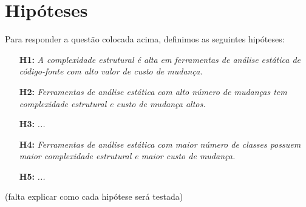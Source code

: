 \section{Hipóteses} \label{hipoteses}

Para responder a questão colocada acima, definimos as seguintes hipóteses:

\begin{enumerate}
  \item[{\bf H1:}] {\em A complexidade estrutural é alta em ferramentas de
    análise estática de código-fonte com alto valor de custo de mudança.}

  \item[{\bf H2:}] {\em Ferramentas de análise estática com alto número de
    mudanças tem complexidade estrutural e custo de mudança altos.}

  \item[{\bf H3:}] {\em  ...}
    

  \item[{\bf H4:}] {\em Ferramentas de análise estática com maior número de
    classes possuem maior complexidade estrutural e maior custo de mudança.}

  \item[{\bf H5:}] {\em  ...}

\end{enumerate}

(falta explicar como cada hipótese será testada)

%
%


